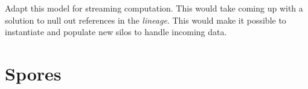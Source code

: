 \documentclass[preprint]{sigplanconf}
\theoremstyle{definition}
\theoremstyle{definition}
\begin{document}
Adapt this model for streaming computation. This would take coming up with a
solution to null out references in the {\em lineage}. This would make it possible to instantiate and populate new silos to handle incoming data.

\appendix
\section{Spores}
\label{appendix:spores}











\end{document}
